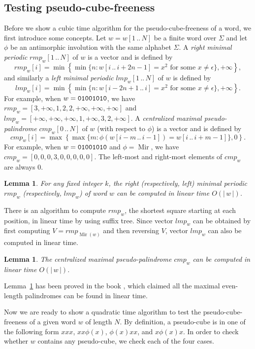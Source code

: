 \documentclass[12pt]{article}
\def\abs#1{{|\,#1\,|}}
\def\mirror{{\operatorname{Mir}}}
\newtheorem{lemma}[theorem]{Lemma}
\begin{document}
\subsection{Testing pseudo-cube-freeness}
Before we show a cubic time algorithm for the pseudo-cube-freeness
of a word, we first introduce some concepts. Let $w=w[1\,..\,N]$ be
a finite word over $\Sigma$ and let $\phi$ be an antimorphic
involution with the same alphabet $\Sigma$. A \emph{right minimal
periodic} $rmp_w[1\,..\,N]$ of $w$ is a vector and is defined by
  \[rmp_w[i]=\min\left\{\min\{n:w[i\,..\,i+2n-1]=x^2\textrm{ for some }x\neq\epsilon\},+\infty\right\},\]
and similarly a \emph{left minimal periodic} $lmp_w[1\,..\,N]$ of
$w$ is defined by
  \[lmp_w[i]=\min\left\{\min\{n:w[i-2n+1\,..\,i]=x^2\textrm{ for some }x\neq\epsilon\},+\infty\right\}.\]
For example, when $w=\tt01001010$, we have
$rmp_w=[3,+\infty,1,2,2,+\infty,+\infty,+\infty]$ and
$lmp_w=[+\infty,+\infty,+\infty,1,+\infty,3,2,+\infty]$. A
\emph{centralized maximal pseudo-palindrome} $cmp_w[0\,..\,N]$ of
$w$ (with respect to $\phi$) is a vector and is defined by
  \[cmp_w[i]=\max\left\{\max\{m:\phi(w[i-m\,..\,i-1])=w[i\,..\,i+m-1]\},0\right\}.\]
For example, when $w=\tt01001010$ and $\phi=\mirror$, we have
$cmp_w=[0,0,0,3,0,0,0,0,0]$. The left-most and right-most elements
of $cmp_w$ are always $0$.


\begin{lemma}\label{lemma:rmplmp}
For any fixed integer $k$, the right (respectively, left) minimal
periodic $rmp_w$ (respectively, $lmp_w$) of word $w$ can be computed
in linear time $O(\abs{w})$.
\end{lemma}
There is an algorithm to compute $rmp_w$, the shortest square
starting at each position, in linear time \cite{Kosaraju1994} by
using suffix tree. Since vector $lmp_w$ can be obtained by first
computing $V=rmp_{\mirror(w)}$ and then reversing $V$, vector
$lmp_w$ can also be computed in linear time.


\begin{lemma}\label{lemma:cmp}
The centralized maximal pseudo-palindrome $cmp_w$ can be computed in
linear time $O(\abs{w})$.
\end{lemma}
Lemma~\ref{lemma:cmp} has been proved in the book
\cite[page~197--198]{Gusfield1997}, which claimed all the maximal
even-length palindromes can be found in linear time.


Now we are ready to show a quadratic time algorithm to test the
pseudo-cube-freeness of a given word $w$ of length $N$. By
definition, a pseudo-cube is in one of the following form $xxx$,
$xx\phi(x)$, $\phi(x)xx$, and $x\phi(x)x$. In order to check whether
$w$ contains any pseudo-cube, we check each of the four cases.
\end{document}
